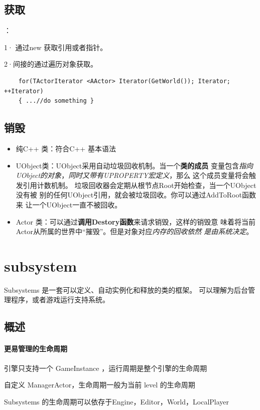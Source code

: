 \documentclass[UTF8,a4paper,12pt]{ctexbook}
\begin{document}
		\subsection{获取}：
		
			1· 通过new 获取引用或者指针。
			
			2·间接的通过遍历对象获取。
			
			\begin{lstlisting}
	for(TActorIterator <AActor> Iterator(GetWorld()); Iterator; ++Iterator) 
	{ ...//do something }			
			\end{lstlisting}
		
		\subsection{销毁}
			\begin{itemize}
				\item 纯C++ 类：符合C++ 基本语法
				\item UObject类：UObject采用自动垃圾回收机制。当一个\textbf{类的成员} 变量包含\textit{指向UObject的对象}，\textit{同时又带有UPROPERTY宏定义}，那么 这个成员变量将会触发引用计数机制。 垃圾回收器会定期从根节点Root开始检查，当一个UObject没有被 别的任何UObject引用，就会被垃圾回收。你可以通过AddToRoot函数来 让一个UObject一直不被回收。
				\item Actor 类：可以通过\textbf{调用Destory函数}来请求销毁，这样的销毁意 味着将当前Actor从所属的世界中“摧毁”。但是对象对应\textit{内存的回收依然 是由系统决定}。
			\end{itemize}
		
	
	\section{subsystem}
		Subsystems 是一套可以定义、自动实例化和释放的类的框架。 可以理解为后台管理程序，或者游戏运行支持系统。
		
		\subsection{概述}
			\paragraph{更易管理的生命周期}
				引擎只支持一个 GameInstance ，运行周期是整个引擎的生命周期
				
				自定义 ManagerActor，生命周期一般为当前 level 的生命周期
				
				Subsystems 的生命周期可以依存于Engine，Editor，World，LocalPlayer
				
\end{document}
